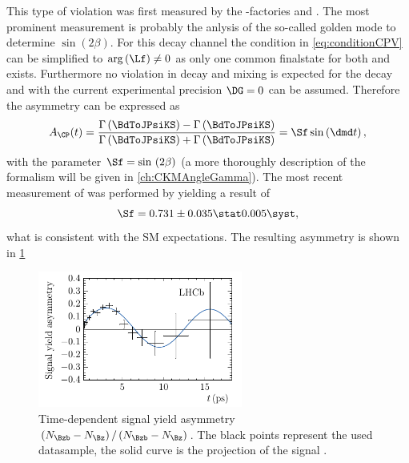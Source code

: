 This type of \CP violation was first measured by the \B-factories \babar \cite{Aubert:2001nu} and \belle \cite{Abe:2001xe}.
The most prominent measurement is probably the anlysis of the so-called golden mode \BdToJPsiKS to determine $\sin{}\left(2\beta\right)$.
For this decay channel the condition in \cref{eq:conditionCPV} can be simplified to $\arg\left(\Lf\right)\neq0$ as only one common finalstate for both \Bz and \Bzb exists.
Furthermore no \CP violation in decay and mixing is expected for the decay \BdToJPsiKS and with the current experimental precision $\DG=0$ can be assumed.
Therefore the \CP asymmetry can be expressed as
\begin{equation}
A_{\CP}(t)=\frac{\Gamma\left(\BdToJPsiKS\right)-\Gamma\left(\BdToJPsiKS\right)}{\Gamma\left(\BdToJPsiKS\right)+\Gamma\left(\BdToJPsiKS\right)}=\Sf\sin\left(\dmd t\right),
\end{equation}
with the parameter $\Sf=\sin{}\left(2\beta\right)$ (a more thoroughly description of the formalism will be given in \cref{ch:CKMAngleGamma}).
The most recent measurement of \Sf was performed by \lhcb \cite{Aaij:2015vza} yielding a result of
\begin{equation}
\Sf=0.731\pm0.035\stat0.005\syst,
\end{equation}
what is consistent with the \ac{SM} expectations. The resulting \CP asymmetry is shown in \cref{fig:sin2beta}
\begin{figure}[tbp]
	\centering
	\includegraphics[width=0.6\textwidth]{03CPV/figs/InterferenceCPV.pdf}
	\caption{Time-dependent signal yield asymmetry $\left(N_{\Bzb}-N_{\Bz}\right)/\left(N_{\Bzb}-N_{\Bz}\right)$. The black points represent the used datasample, the solid curve is the projection of the signal \PDF.}
	\label{fig:sin2beta}
\end{figure}
